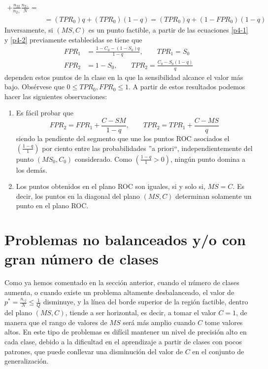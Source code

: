 \begin{description}
\begin{equation}
\begin{split}
+\frac{n_ {22}}
{n_{2\circ}}\frac{n_{2\circ}}{N}= \\
&=(TPR_{0})q+(TPR_{0})(1-q)=(TPR_{0})q+(1-FPR_{0})(1-q)
\end{split}
\end{equation}
Inversamente, si $(MS,C)$ es un punto factible, a partir de las ecuaciones \ref{p4-1} y
\ref{p4-2} previamente establecidas se tiene que
\begin{align}
FPR_{1}&=\frac{1-C_{0}-(1-S_{0})q}{1-q},\qquad TPR_{1}=S_{0} \nonumber \\
FPR_{2}&=1-S_{0}, \qquad TPR_{2}=\frac{C_{0}-S_{0}(1-q)}{q} \nonumber
\end{align}
dependen estos puntos de la clase en la que la sensibilidad alcance el valor más bajo.
Obsérvese que $0\leq TPR_{0},FPR_{0}\leq1$.
A partir de estos resultados podemos hacer las siguientes observaciones:
\begin{enumerate}
	\item Es fácil probar que
	\begin{displaymath}
	FPR_{2}=FPR_{1}+\frac{C-SM}{1-q}, \qquad TPR_{2}=TPR_{1}+\frac{C-MS}{q}
	\end{displaymath}
	siendo la pendiente del segmento que une los puntos ROC asociados el
	$\displaystyle \left(\frac {1-q}{1}\right) $ por ciento entre las probabilidades ''a
priori``,
	independientemente del punto $(MS_{0},C_{0})$ considerado. Como $\displaystyle
	\left( \frac{1-q}{1}>0\right)$, ningún punto domina a los demás.
	\item Los puntos obtenidos en el plano ROC son iguales, si y solo si, $MS=C$.
	Es decir, los puntos en la diagonal del plano $(MS,C)$ determinan solamente un punto en
el
	plano ROC.
\end{enumerate}
\end{description}

\section{Problemas no balanceados y/o con gran número de clases}\label{balanceados}
\noindent Como ya hemos comentado en la sección anterior, cuando el número de clases
aumenta, o cuando existe un problema altamente
desbalanceado, el valor de $\displaystyle p^*=\frac{n_{\circ j}}{N}\leq \frac{1}{Q}$ disminuye, y la
línea
del borde superior de la región factible, dentro del plano $\left(MS,C\right)$, tiende a
ser horizontal, es decir, a tomar el valor $C=1$, de manera que el rango de valores de
$MS$ será más amplio cuando $C$ tome valores altos. En este tipo de problemas
\cite{Ho2002,Murphey2004} es difícil
mantener un nivel de precisión alto en cada clase,	debido a la dificultad en el
aprendizaje a partir de clases con pocos patrones, que puede conllevar una disminución
del valor de $C$ en el conjunto de generalización.

